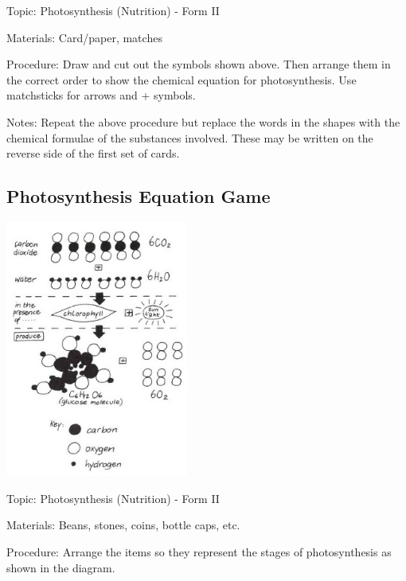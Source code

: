 \begin{multicols}{2}
\begin{description*}
\item[Topic:]{Photosynthesis (Nutrition) - Form II}
\item[Materials:]{Card/paper, matches}
\item[Procedure:]{Draw and cut out the symbols shown above. Then arrange them in the correct order to
show the chemical equation for photosynthesis. Use matchsticks for arrows and + symbols.}
\item[Notes:]{Repeat the above procedure but replace the words in the shapes with the chemical
formulae of the substances involved. These may be written on the reverse side of the first set
of cards.}
\end{description*}

\subsection{Photosynthesis Equation Game} %

\begin{center}
\includegraphics[width=0.45\textwidth]{./img/vso/photo-game.jpg}
\end{center}

\begin{description*}
\item[Topic:]{Photosynthesis (Nutrition) - Form II}
\item[Materials:]{Beans, stones, coins, bottle caps, etc.}
\item[Procedure:]{Arrange the items so they
represent the stages of
photosynthesis as shown in the
diagram.}
\end{description*}


\end{multicols}
